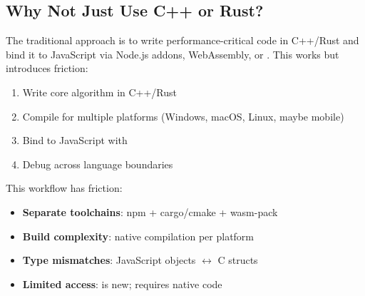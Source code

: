 \subsection{Why Not Just Use C++ or Rust?}

The traditional approach is to write performance-critical code in C++/Rust and bind it to JavaScript via Node.js addons, WebAssembly, or . This works but introduces friction:

\begin{enumerate}[noitemsep]
  \item Write core algorithm in C++/Rust
  \item Compile for multiple platforms (Windows, macOS, Linux, maybe mobile)
  \item Bind to JavaScript with 
  \item Debug across language boundaries
\end{enumerate}

This workflow has friction:
\begin{itemize}[noitemsep]
  \item \textbf{Separate toolchains}: npm + cargo/cmake + wasm-pack
  \item \textbf{Build complexity}: native compilation per platform
  \item \textbf{Type mismatches}: JavaScript objects $\leftrightarrow$ C structs
  \item \textbf{Limited  access}:  is new;  requires native code
\end{itemize}
